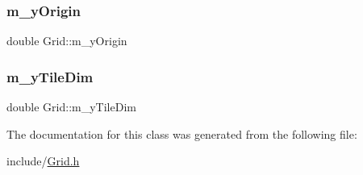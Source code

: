 \mbox{\label{class_grid_a16b2fc5a6e96ad2d59d59b52db83f4aa}} 
\subsubsection{\texorpdfstring{m\_yOrigin}{m\_yOrigin}}
{\footnotesize\ttfamily double Grid\+::m\+\_\+y\+Origin\hspace{0.3cm}{\ttfamily [private]}}

\mbox{\label{class_grid_a497eeffc4a16a021e15ecbc130f4f644}} 
\subsubsection{\texorpdfstring{m\_yTileDim}{m\_yTileDim}}
{\footnotesize\ttfamily double Grid\+::m\+\_\+y\+Tile\+Dim\hspace{0.3cm}{\ttfamily [private]}}



The documentation for this class was generated from the following file\+:\begin{DoxyCompactItemize}
\item 
include/\mbox{\hyperlink{_grid_8h}{Grid.\+h}}\end{DoxyCompactItemize}

